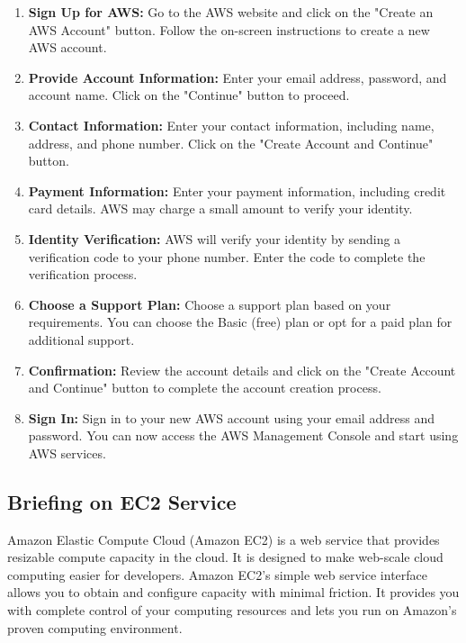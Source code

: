 \documentclass[11pt]{article}
\begin{document}
\begin{enumerate}
    \item \textbf{Sign Up for AWS:} Go to the AWS website and click on the "Create an AWS Account" button. Follow the on-screen instructions to create a new AWS account.
    \item \textbf{Provide Account Information:} Enter your email address, password, and account name. Click on the "Continue" button to proceed.
    \item \textbf{Contact Information:} Enter your contact information, including name, address, and phone number. Click on the "Create Account and Continue" button.
    \item \textbf{Payment Information:} Enter your payment information, including credit card details. AWS may charge a small amount to verify your identity.
    \item \textbf{Identity Verification:} AWS will verify your identity by sending a verification code to your phone number. Enter the code to complete the verification process.
    \item \textbf{Choose a Support Plan:} Choose a support plan based on your requirements. You can choose the Basic (free) plan or opt for a paid plan for additional support.
    \item \textbf{Confirmation:} Review the account details and click on the "Create Account and Continue" button to complete the account creation process.
    \item \textbf{Sign In:} Sign in to your new AWS account using your email address and password. You can now access the AWS Management Console and start using AWS services.
\end{enumerate}

\subsection{Briefing on EC2 Service}

Amazon Elastic Compute Cloud (Amazon EC2) is a web service that provides resizable compute capacity in the cloud. It is designed to make web-scale cloud computing easier for developers. Amazon EC2's simple web service interface allows you to obtain and configure capacity with minimal friction. It provides you with complete control of your computing resources and lets you run on Amazon's proven computing environment.
\end{document}

